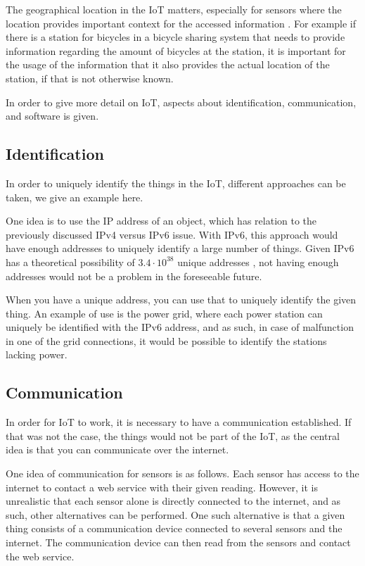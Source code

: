The geographical location in the IoT matters, especially for sensors where the location provides important context for the accessed information \citep{misc:locationMatters}.
For example if there is a station for bicycles in a bicycle sharing system that needs to provide information regarding the amount of bicycles at the station, it is important for the usage of the information that it also provides the actual location of the station, if that is not otherwise known.

In order to give more detail on IoT, aspects about identification, communication, and software is given.

\subsection{Identification}
In order to uniquely identify the things in the IoT, different approaches can be taken, we give an example here.

One idea is to use the IP address of an object, which has relation to the previously discussed IPv4 versus IPv6 issue.
With IPv6, this approach would have enough addresses to uniquely identify a large number of things.
Given IPv6 has a theoretical possibility of $3.4 \cdot 10^{38}$ unique addresses \citep{misc:ipv6}, not having enough addresses would not be a problem in the foreseeable future.

When you have a unique address, you can use that to uniquely identify the given thing.
An example of use is the power grid, where each power station can uniquely be identified with the IPv6 address, and as such, in case of malfunction in one of the grid connections, it would be possible to identify the stations lacking power.

\subsection{Communication}
In order for IoT to work, it is necessary to have a communication established.
If that was not the case, the things would not be part of the IoT, as the central idea is that you can communicate over the internet.

One idea of communication for sensors is as follows.
Each sensor has access to the internet to contact a web service with their given reading.
However, it is unrealistic that each sensor alone is directly connected to the internet, and as such, other alternatives can be performed.
One such alternative is that a given thing consists of a communication device connected to several sensors and the internet.
The communication device can then read from the sensors and contact the web service.

